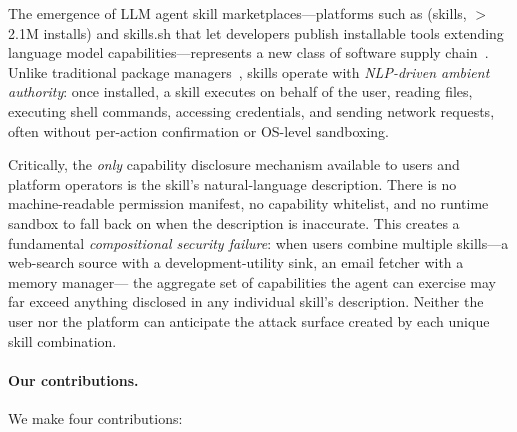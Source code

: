 
The emergence of LLM agent skill marketplaces---platforms such as
\clawhub (\NskillsCH skills, $>$2.1M installs) and skills.sh that let
developers publish installable tools extending language model
capabilities---represents a new class of software supply chain~\cite{xi2023rise,schick2024toolformer}.
Unlike traditional package managers~\cite{zimmermann2019small},
skills operate with \emph{NLP-driven ambient authority}:
once installed, a skill executes on behalf of the user,
reading files, executing shell commands, accessing credentials,
and sending network requests, often without per-action confirmation
or OS-level sandboxing.

Critically, the \emph{only} capability disclosure mechanism available
to users and platform operators is the skill's natural-language description.
There is no machine-readable permission manifest, no capability whitelist,
and no runtime sandbox to fall back on when the description is inaccurate.
This creates a fundamental \emph{compositional security failure}:
when users combine multiple skills---a web-search source with a
development-utility sink, an email fetcher with a memory manager---
the aggregate set of capabilities the agent can exercise
may far exceed anything disclosed in any individual skill's description.
Neither the user nor the platform can anticipate the attack surface
created by each unique skill combination.

\paragraph{Our contributions.}
We make four contributions:


